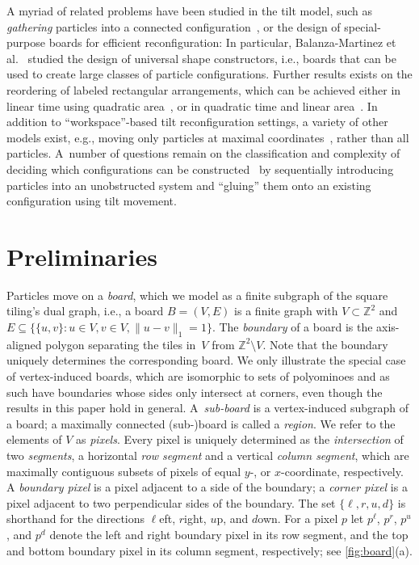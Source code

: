 \documentclass[a4paper,UKenglish,cleveref,thm-restate]{lipics-v2021}
\newcommand{\ZZ}{\ensuremath{\mathbb{Z}^2}}
\begin{document}
A myriad of related problems have been studied in the tilt model, such as \emph{gathering} particles into a connected configuration~\cite{bflkkkrs-drugdelivery2020,konitzny2022gathering}, or the design of special-purpose boards for efficient reconfiguration:
In particular, Balanza-Martinez et al.~\cite{balanza2019full} studied the design of universal shape constructors, i.e., boards that can be used to create large classes of particle configurations.
Further results exists on the reordering of labeled rectangular arrangements, which can be achieved either in linear time using quadratic area~\cite{bdflmw-particle2019}, or in quadratic time and linear area~\cite{ZhangCQB17}.
In addition to ``workspace''-based tilt reconfiguration settings, a variety of other models exist, e.g., moving only particles at maximal coordinates~\cite{aalr-trashcompaction2016,AkitayaLV23}, rather than all particles.
A~number of questions remain on the classification and complexity of deciding which configurations can be constructed~\cite{Becker:tilt_assembly,DBLP:journals/algorithmica/KellerRSS22} by sequentially introducing particles into an unobstructed system and ``gluing'' them onto an existing configuration using tilt movement.
     \section{Preliminaries}\label{sec:preliminaries}

Particles move on a \emph{board}, which we model as a finite subgraph of the
square tiling's dual graph, i.e., a board $B=(V,E)$ is a finite graph with
$V \subset \ZZ$ and \(E \subseteq \{\{u,v\} : {u \in V}, {v \in V},
\|u-v\|_1=1\}\). The \emph{boundary} of a board
is the axis-aligned polygon separating the tiles in~$V$ from ${\ZZ \setminus V}$.
Note that the boundary uniquely determines the corresponding board.
We only illustrate the special case of vertex-induced boards, which are isomorphic to sets of polyominoes and as such have boundaries whose sides only intersect at corners, even though the results in this paper hold in general.
A~\emph{sub-board} is a vertex-induced subgraph of a board; a maximally connected
\mbox{(sub-)board} is called a \emph{region}. We refer to the elements of $V$ as
\emph{pixels}. Every pixel is uniquely determined as the \emph{intersection} of
two \emph{segments}, a horizontal \emph{row segment} and a vertical \emph{column
segment}, which are maximally contiguous subsets of pixels of equal $y$-, or
$x$-coordinate, respectively. A \emph{boundary pixel} is a pixel adjacent to a
side of the boundary; a \emph{corner pixel} is a pixel adjacent to two
perpendicular sides of the boundary.
The set \(\{\ell, r, u, d\}\) is shorthand for the directions
$\ell$eft, $r$ight, $u$p, and $d$own. For a pixel $p$ let $p^{\ell}$, $p^r$,
$p^u$, and $p^d$ denote the left and right boundary pixel in its row segment,
and the top and bottom boundary pixel in its column segment, respectively; see
\cref{fig:board}(a).
\end{document}
